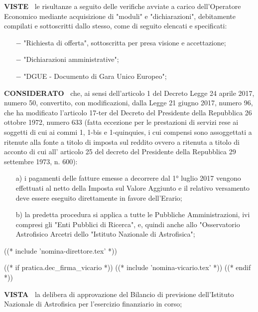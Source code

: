 \textbf{VISTE~}	le risultanze a seguito delle verifiche avviate a
carico dell’Operatore Economico mediante acquisizione di "moduli" e
"dichiarazioni", debitamente compilati e sottoscritti dallo stesso, come
di seguito elencati e specificati: 

\begin{itemize}
\item[$-$] "Richiesta di offerta", sottoscritta per presa visione e accettazione;

\item[$-$] "Dichiarazioni amministrative";

\item[$-$] "DGUE - Documento di Gara Unico Europeo"; 
\end{itemize}

\textbf{CONSIDERATO~} che, ai sensi dell’articolo 1 del
Decreto Legge 24 aprile 2017, numero 50, convertito, con modificazioni,
dalla Legge 21 giugno 2017, numero 96, che ha modificato l’articolo
17-ter del Decreto del Presidente della Repubblica 26 ottobre 1972, numero
633 (fatta eccezione per le prestazioni di servizi rese ai soggetti di
cui ai commi 1, 1-bis e 1-quinquies, i cui compensi sono assoggettati a
ritenute alla fonte a titolo di imposta sul reddito ovvero a ritenuta a
titolo di acconto di cui all' articolo 25 del decreto del Presidente della
Repubblica 29 settembre 1973, n. 600):

\begin{enumerate}

\item[a)] i pagamenti delle fatture
emesse a decorrere dal 1° luglio 2017 vengono effettuati al netto della
Imposta sul Valore Aggiunto e il relativo versamento deve essere eseguito
direttamente in favore dell’Erario;

\item[b)] la predetta procedura si
applica a tutte le Pubbliche Amministrazioni, ivi compresi gli "Enti
Pubblici di Ricerca", e, quindi anche allo "Osservatorio Astrofisico
Arcetri dello "Istituto Nazionale di Astrofisica";
\end{enumerate}

((* include 'nomina-direttore.tex' *))

((* if pratica.dec_firma_vicario *))
((* include 'nomina-vicario.tex' *))
((* endif *))

\textbf{VISTA~}	la delibera di approvazione del Bilancio di previsione
dell’Istituto Nazionale di Astrofisica per l’esercizio finanziario
 in corso;

